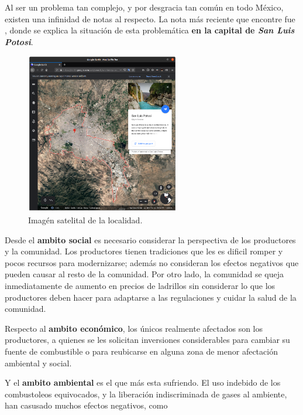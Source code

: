 \documentclass[12pt]{article}
\begin{document}
	\par Al ser un problema tan complejo, y por desgracia tan com\'un en todo M\'exico, existen una infinidad de notas al respecto. La nota m\'as reciente que encontre fue \cite{noticia}, donde se explica la situaci\'on de esta problem\'atica \textbf{en la capital de \textit{San Luis Potosi}}.

	\begin{figure}[h]
		\centering
		\includegraphics [width=0.6\textwidth] {San_Luis_Potosi-2.png}
		\caption{Imag\'en satelital de la localidad.}
	\end{figure}
	
	\par Desde el \textbf{ambito social} es necesario considerar la perspectiva de los productores y la comunidad. Los productores tienen tradiciones que les es dificil romper y pocos recursos para modernizarse; adem\'as no consideran los efectos negativos que pueden causar al resto de la comunidad. Por otro lado, la comunidad se queja inmediatamente de aumento en precios de ladrillos sin considerar lo que los productores deben hacer para adaptarse a las regulaciones y cuidar la salud de la comunidad.
	
	\par Respecto al \textbf{ambito econ\'omico}, los \'unicos realmente afectados son los productores, a quienes se les solicitan inversiones considerables para cambiar su fuente de combustible o para reubicarse en alguna zona de menor afectaci\'on ambiental y social.
	
	\par Y el \textbf{ambito ambiental} es el que m\'as esta sufriendo. El uso indebido de los combustoleos equivocados, y la liberaci\'on indiscriminada de gases al ambiente, han casusado muchos efectos negativos, como
	
\end{document}

